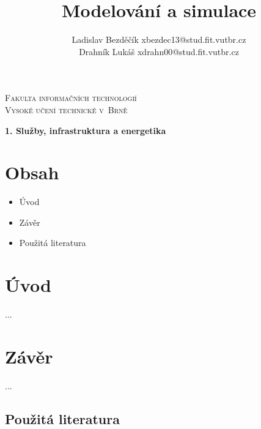 \documentclass[a4paper,11pt]{article}
\begin{document}
\begin{center}
\textsc{\Huge Fakulta informačních technologií\\
Vysoké učení technické v~Brně\\}

\LARGE \title{Modelování a simulace\\}
\textbf{1. Služby, infrastruktura a energetika}

\hfill \author{Ladislav Bezděčík xbezdec13@stud.fit.vutbr.cz\\
 Drahník Lukáš xdrahn00@stud.fit.vutbr.cz}
\end{center}

{\let\newpage\relax\maketitle}

\newpage

\section*{Obsah}
\begin{itemize}
  \item Úvod
  \item Závěr
  \item Použitá literatura
\end{itemize}

\newpage

\section*{Úvod}
...

\section*{Závěr}
...

\subsection{Použitá literatura}

\nocite{*}




\newpage
\thispagestyle{empty}
\end{document}
